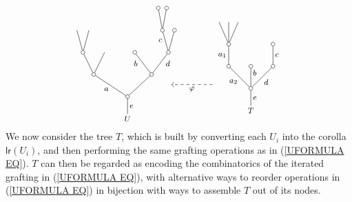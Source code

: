 \documentclass[a4paper,10pt]{article}%
\begin{document}
\begin{example}
\begin{equation}
\begin{tikzpicture}[grow=up,auto,level distance=2.1em,
	every node/.style = {font=\footnotesize,inner sep=2pt},
	dummy/.style={circle,draw,inner sep=0pt,minimum size=1.375mm}]
\begin{scope}[xshift=-2em]
\end{scope}
\begin{scope}[yshift=1em]
	\begin{scope}[level distance=2.3em]
	\tikzstyle{level 2}=[sibling distance=3.5em]%
	\tikzstyle{level 3}=[sibling distance=2.25em]%
	\tikzstyle{level 4}=[sibling distance=1.25em]%
	\tikzstyle{level 5}=[sibling distance=0.875em]%
		\node at (5.5,0) {$U$}
			child{node [dummy] {}
				child[sibling distance =5em]{node [dummy] {}
					child[sibling distance =3.5em]{node [dummy] {}
						child{node [dummy] {}
						}
						child{node [dummy] {}
							child{node [dummy] {}}
							child{node [dummy] {}}
						edge from parent node [near end] {$c$}}
					edge from parent node [swap, near end] {$d$}}
					child[sibling distance =3.5em]{node [dummy] {}
					edge from parent node [near end] {$b$}}
				}
				child[sibling distance =7em]{node [dummy] {}
					child
					child{node [dummy] {}
						child
						child
					}
				edge from parent node {$a$}}
			edge from parent node [swap] {$e$}};
	\end{scope}
	\begin{scope}[level distance=2.3em]
	\tikzstyle{level 2}=[sibling distance=2.3em]%
	\tikzstyle{level 4}=[sibling distance=1em]%
		\node at (10,0.3) {$T$}
			child{node [dummy] {}
				child{node [dummy] {}
					child{node [dummy] {}
					edge from parent node [swap] {$c$}}	
				edge from parent node [swap] {$d$}}
				child{node [dummy] {}
				edge from parent node [near end,swap] {$b$}}
				child{node [dummy] {}
					child{node [dummy] {}
						child
						child
						child
					edge from parent node {$a_1$}}
				edge from parent node {$a_2$}}
			edge from parent node [swap] {$e$}};
	\end{scope}
	\draw [->,dashed] (8.6,1.25) -- node {$\varphi$} (7.1,1.25);
\end{scope}
	\end{tikzpicture}
\end{equation}
We now consider the tree $T$, which is built by converting each $U_i$ into the corolla $\mathsf{lr}(U_i)$, and then performing the same grafting operations as in (\ref{UFORMULA EQ}). $T$ can then be regarded as encoding the combinatorics of the iterated grafting in (\ref{UFORMULA EQ}), with alternative ways to reorder operations in (\ref{UFORMULA EQ}) in bijection with ways to assemble $T$ out of its nodes.



\end{example}
\end{document}
